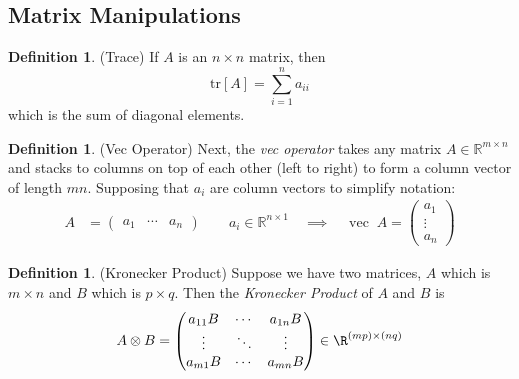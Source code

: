 \documentclass[12pt]{article}
\theoremstyle{plain}
\theoremstyle{definition}
\newtheorem{defn}[thm]{Definition}
\theoremstyle{remark}
\newcommand{\Rmn}{\mathbb{R}^{m\times n}}
\newcommand{\vc}{\operatorname{vec}}
\begin{document}
\clearpage
\subsection{Matrix Manipulations}

\begin{defn}(Trace)
If $A$ is an $n\times n$ matrix, then
\begin{equation}
    \text{tr}[A] = \sum^n_{i=1} a_{ii}
\end{equation}
which is the sum of diagonal elements.
\end{defn}

\begin{defn}(Vec Operator)
Next, the \emph{vec operator} takes any matrix $A\in\Rmn$
and stacks to columns on top of each other (left to right) to form a
column vector of length $mn$.  Supposing that $a_i$ are column vectors
to simplify notation:
\begin{align*}
  A &= \begin{pmatrix} a_1 & \cdots & a_n \end{pmatrix}
	\qquad a_i \in \mathbb{R}^{n\times 1}
  \quad\implies\quad
  \vc\; A =
	\begin{pmatrix} a_1 \\ \vdots \\ a_n \end{pmatrix}
\end{align*}
\end{defn}

\begin{defn}(Kronecker Product)
Suppose we have two matrices, $A$ which is $m \times n$ and $B$
which is $p\times q$. Then the {\sl Kronecker Product} of $A$ and $B$ is
\begin{align*}
  A \otimes B = \begin{pmatrix} a_{11} B & \cdots & a_{1n} B \\
      \vdots & \ddots & \vdots \\
      a_{m1} B & \cdots & a_{mn}B \end{pmatrix}
  \in \R^{(mp)\times(nq)}
\end{align*}
\end{defn}
\end{document}
